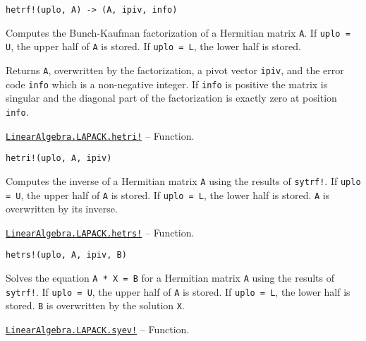 \begin{adjustwidth}{2em}{0pt}


\begin{verbatim}
hetrf!(uplo, A) -> (A, ipiv, info)
\end{verbatim}

Computes the Bunch-Kaufman factorization of a Hermitian matrix \texttt{A}. If \texttt{uplo = U}, the upper half of \texttt{A} is stored. If \texttt{uplo = L}, the lower half is stored.

Returns \texttt{A}, overwritten by the factorization, a pivot vector \texttt{ipiv}, and the error code \texttt{info} which is a non-negative integer. If \texttt{info} is positive the matrix is singular and the diagonal part of the factorization is exactly zero at position \texttt{info}.



\end{adjustwidth}
\hypertarget{3196814042515994361}{} 
\hyperlink{3196814042515994361}{\texttt{LinearAlgebra.LAPACK.hetri!}}  -- {Function.}

\begin{adjustwidth}{2em}{0pt}


\begin{verbatim}
hetri!(uplo, A, ipiv)
\end{verbatim}

Computes the inverse of a Hermitian matrix \texttt{A} using the results of \texttt{sytrf!}. If \texttt{uplo = U}, the upper half of \texttt{A} is stored. If \texttt{uplo = L}, the lower half is stored. \texttt{A} is overwritten by its inverse.



\end{adjustwidth}
\hypertarget{16647495205297911695}{} 
\hyperlink{16647495205297911695}{\texttt{LinearAlgebra.LAPACK.hetrs!}}  -- {Function.}

\begin{adjustwidth}{2em}{0pt}


\begin{verbatim}
hetrs!(uplo, A, ipiv, B)
\end{verbatim}

Solves the equation \texttt{A * X = B} for a Hermitian matrix \texttt{A} using the results of \texttt{sytrf!}. If \texttt{uplo = U}, the upper half of \texttt{A} is stored. If \texttt{uplo = L}, the lower half is stored. \texttt{B} is overwritten by the solution \texttt{X}.



\end{adjustwidth}
\hypertarget{9979432299825280284}{} 
\hyperlink{9979432299825280284}{\texttt{LinearAlgebra.LAPACK.syev!}}  -- {Function.}

